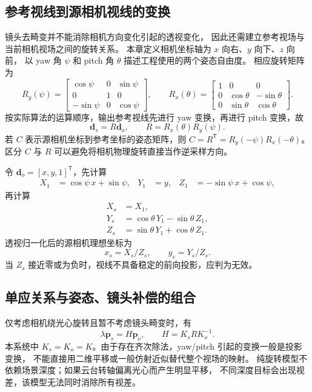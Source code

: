 \subsection{参考视线到源相机视线的变换}
镜头去畸变并不能消除相机方向变化引起的透视变化，
因此还需建立参考视场与当前相机视场之间的旋转关系。
本章定义相机坐标轴为 $x$ 向右、$y$ 向下、$z$ 向前，
以 yaw 角 $\psi$ 和 pitch 角 $\theta$ 描述工程使用的两个姿态自由度。
相应旋转矩阵为
\begin{equation}
R_y(\psi)=\begin{bmatrix}
\cos\psi&0&\sin\psi\\0&1&0\\-\sin\psi&0&\cos\psi
\end{bmatrix},\qquad
R_x(\theta)=\begin{bmatrix}
1&0&0\\0&\cos\theta&-\sin\theta\\0&\sin\theta&\cos\theta
\end{bmatrix}.
\end{equation}
按实际算法的运算顺序，输出参考视线先进行 yaw 变换，再进行 pitch 变换，故
\begin{equation}
\boldsymbol d_s=R\boldsymbol d_o,\qquad R=R_x(\theta)R_y(\psi).
\label{eq:pose-rotation}
\end{equation}
若 $C$ 表示源相机坐标到参考坐标的姿态矩阵，则
$C=R^{\mathsf T}=R_y(-\psi)R_x(-\theta)$。
区分 $C$ 与 $R$ 可以避免将相机物理旋转直接当作逆采样方向。

令 $\boldsymbol d_o=[x,y,1]^{\mathsf T}$，先计算
\begin{align}
X_1&=\cos\psi\,x+\sin\psi,&Y_1&=y,&Z_1&=-\sin\psi\,x+\cos\psi,
\end{align}
再计算
\begin{align}
X_s&=X_1,\\
Y_s&=\cos\theta\,Y_1-\sin\theta\,Z_1,\\
Z_s&=\sin\theta\,Y_1+\cos\theta\,Z_1.
\end{align}
透视归一化后的源相机理想坐标为
\begin{equation}
x_s=X_s/Z_s,\qquad y_s=Y_s/Z_s.
\label{eq:pose-normalize}
\end{equation}
当 $Z_s$ 接近零或为负时，视线不具备稳定的前向投影，应判为无效。

\subsection{单应关系与姿态、镜头补偿的组合}
仅考虑相机绕光心旋转且暂不考虑镜头畸变时，有
\begin{equation}
\lambda\boldsymbol p_s=H\boldsymbol p_o,\qquad
H=K_sRK_o^{-1}.
\label{eq:pose-homography}
\end{equation}
本系统中 $K_s=K_o=K$。由于存在齐次除法，yaw/pitch 引起的变换一般是投影变换，
不能直接用二维平移或一般仿射近似替代整个视场的映射。
纯旋转模型不依赖场景深度；如果云台转轴偏离光心而产生明显平移，
不同深度目标会出现视差，该模型无法同时消除所有视差。

